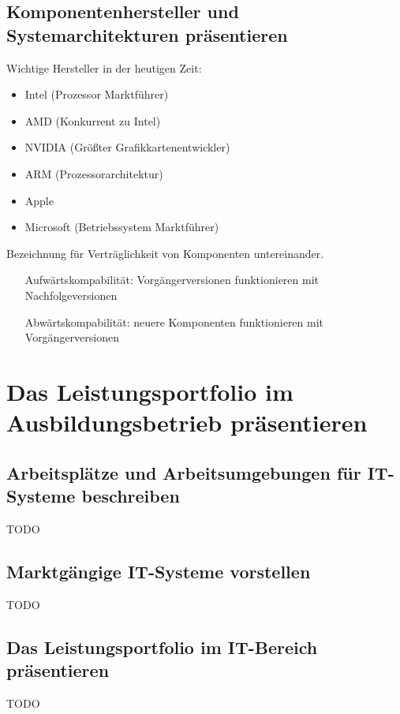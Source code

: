 \documentclass[11pt]{article}
\begin{document}
\subsection{Komponentenhersteller und Systemarchitekturen präsentieren}
    Wichtige Hersteller in der heutigen Zeit:
    \begin{itemize}
        \item Intel (Prozessor Marktführer)
        \item AMD (Konkurrent zu Intel)
        \item NVIDIA (Größter Grafikkartenentwickler)
        \item ARM (Prozessorarchitektur)
        \item Apple
        \item Microsoft (Betriebssystem Marktführer)
    \end{itemize}
    {
    \vspace{0.5em}
    \centering
    \begin{tcolorbox}[width=15cm, title=Kompatibilität, coltitle=white, colframe=white!20!blue, colback=white!80!blue]
        Bezeichnung für Verträglichkeit von Komponenten untereinander.
        \begin{itemize}[leftmargin=4cm]
            \item[Aufwärtskompabilität:] Vorgängerversionen funktionieren mit Nachfolgeversionen
            \item[Abwärtskompabilität: ] neuere Komponenten funktionieren mit Vorgängerversionen
        \end{itemize}
    \end{tcolorbox}
    }

\newpage
\section{Das Leistungsportfolio im Ausbildungsbetrieb präsentieren}
\subsection{Arbeitsplätze und Arbeitsumgebungen für IT-Systeme beschreiben}
    TODO
\subsection{Marktgängige IT-Systeme vorstellen}
    TODO
\subsection{Das Leistungsportfolio im IT-Bereich präsentieren}
    TODO
\end{document}
